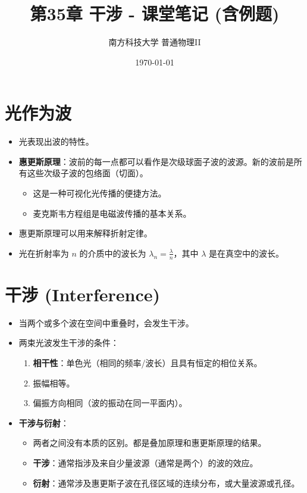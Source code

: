 \documentclass[UTF8]{ctexart}
\title{第35章 干涉 - 课堂笔记 (含例题)}
\author{南方科技大学 普通物理II}
\date{\today}
\begin{document}
\maketitle

\section{光作为波}
\begin{itemize}
    \item 光表现出波的特性。
    \item \textbf{惠更斯原理}：波前的每一点都可以看作是次级球面子波的波源。新的波前是所有这些次级子波的包络面（切面）。
        \begin{itemize}
            \item 这是一种可视化光传播的便捷方法。
            \item 麦克斯韦方程组是电磁波传播的基本关系。
        \end{itemize}
    \item 惠更斯原理可以用来解释折射定律。
    \item 光在折射率为 $n$ 的介质中的波长为 $\lambda_n = \frac{\lambda}{n}$，其中 $\lambda$ 是在真空中的波长。
\end{itemize}

\section{干涉 (Interference)}
\begin{itemize}
    \item 当两个或多个波在空间中重叠时，会发生干涉。
    \item 两束光波发生干涉的条件：
        \begin{enumerate}
            \item \textbf{相干性}：单色光（相同的频率/波长）且具有恒定的相位关系。
            \item 振幅相等。
            \item 偏振方向相同（波的振动在同一平面内）。
        \end{enumerate}
    \item \textbf{干涉与衍射}：
        \begin{itemize}
            \item 两者之间没有本质的区别。都是叠加原理和惠更斯原理的结果。
            \item \textbf{干涉}：通常指涉及来自少量波源（通常是两个）的波的效应。
            \item \textbf{衍射}：通常涉及惠更斯子波在孔径区域的连续分布，或大量波源或孔径。
        \end{itemize}
\end{itemize}
\end{document}

